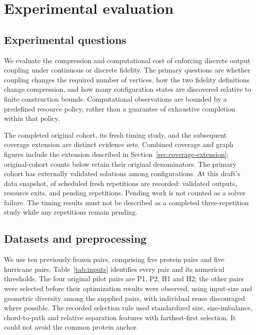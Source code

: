 \chapter{Experimental evaluation}
\label{chap:experiments}

\section{Experimental questions}
We evaluate the compression and computational cost of enforcing discrete output coupling under continuous or discrete fidelity.
The primary questions are whether coupling changes the required number of vertices,
how the two fidelity definitions change compression,
and how many configuration states are discovered relative to finite construction bounds.
Computational observations are bounded by a predefined resource policy, rather than a guarantee of exhaustive completion within that policy.

The completed original cohort, its fresh timing study, and the subsequent coverage extension are distinct evidence sets. Combined coverage and graph figures include the extension described in Section~\ref{sec:coverage-extension}; original-cohort counts below retain their original denominators. The primary cohort has \PrimaryValid{} externally validated solutions among \PrimaryCount{} configurations. At this draft's data snapshot, \TimingFinished{} of \TimingPlanned{} scheduled fresh repetitions are recorded: \TimingValid{} validated outputs, \TimingResource{} resource exits, and \TimingPending{} pending repetitions. Pending work is not counted as a solver failure. The timing results must not be described as a completed three-repetition study while any repetitions remain pending.

\section{Datasets and preprocessing}
We use ten previously frozen pairs, comprising five protein pairs and five hurricane pairs. Table~\ref{tab:inputs} identifies every pair and its numerical thresholds. The four original pilot pairs are P1, P2, H1 and H2; the other pairs were selected before their optimization results were observed, using input-size and geometric diversity among the supplied pairs, with individual reuse discouraged where possible. The recorded selection rule used standardized size, size-imbalance, chord-to-path and relative separation features with farthest-first selection. It could not avoid the common protein anchor.

